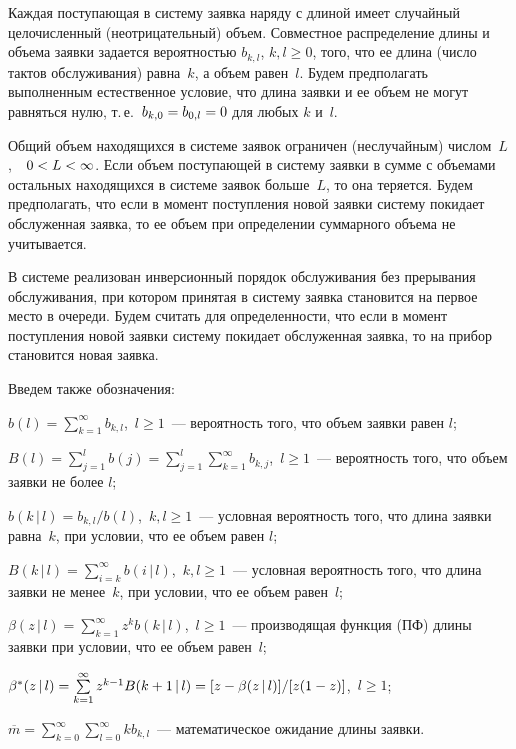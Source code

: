 \begin{multicols}{2}
Каждая поступающая в систему заявка наряду с длиной
имеет случайный целочисленный (не\-от\-ри\-ца\-тель\-ный) объем.
Совместное распределение длины и объема заявки задается
вероятностью $b_{k,l}$,  $k,l\ge 0$, того, что ее длина
(число тактов обслуживания) равна~$k$, а объем равен~$l$.
Будем предполагать выполненным естественное условие, что
длина заявки и ее объем не могут равняться нулю, т.\,е.\
$b_{k,0}\hm=b_{0,l}\hm=0$ для любых $k$ и~$l$.

Общий объем находящихся в системе заявок ограничен
(неслучайным) числом~$L$,\ \ $0\hm<L\hm<\infty$.
Если объем поступающей в систему заявки в
сумме с объемами остальных находящихся в сис\-те\-ме
заявок больше~$L$, то она теряется. Будем предполагать, что если в момент поступления
новой заявки систему покидает обслуженная заявка, 
то ее объем при определении суммарного объема не учитывается.

В системе реализован инверсионный порядок обслуживания
без прерывания обслуживания, при котором принятая в
сис\-те\-му заявка становится на первое место в очереди.
Будем считать для определенности, что если в момент
поступления новой заявки сис\-те\-му покидает обслуженная
заявка, то на прибор становится новая заявка.

Введем также обозначения:

\noindent
$b(l)=\sum\limits_{k=1}^\infty b_{k,l}$,\  $l\ge 1$~---
вероятность того, что объем заявки равен $l$;

\noindent
$B(l)=\sum\limits_{j=1}^l b(j) =
\sum\limits_{j=1}^l \sum\limits_{k=1}^\infty b_{k,j}
$,\  $l\ge 1$~--- вероятность того, что объем заявки
не более $l$;

\noindent
$b(k\,|\,l)=b_{k,l}/b(l)$,\ $k,l\ge 1$~--- условная
ве\-ро\-ят\-ность того, что длина заявки равна~$k$, при условии, что
ее объем равен $l$;

\noindent
$B(k\,|\,l)=
\sum\limits_{i=k}^\infty b(i\,|\,l)$,\ $k,l\ge 1$~---
условная вероятность того, что длина заявки не
менее~$k$, при условии, что ее объем равен~$l$;

\noindent
$\beta(z\,|\,l)=\sum\limits_{k=1}^\infty z^k b(k\,|\,l)$,\ 
$l\ge 1$~---
производящая функ\-ция (ПФ) длины заявки при условии,
что ее объем равен~$l$;

\noindent
$\beta^*(z\,|\,l)=
\sum\limits_{k=1}^\infty z^{k-1} B(k+1\,|\,l)
=[z-\beta(z\,|\,l)]/[z(1\hm-z)]$,\  $l\ge 1$;

\noindent
$\overline m=\sum\limits_{k=0}^\infty
\sum\limits_{l=0}^\infty k b_{k,l}$~---
математическое ожидание длины заявки.


\end{multicols}
